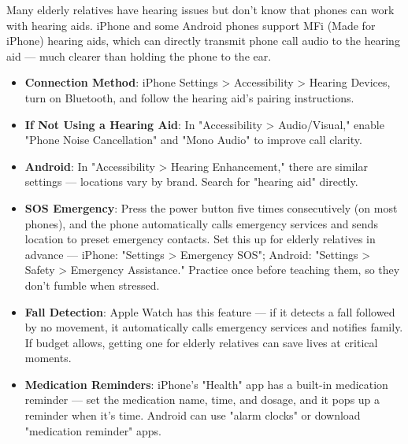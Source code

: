 
Many elderly relatives have hearing issues but don't know that phones can work with hearing aids. iPhone and some Android phones support MFi (Made for iPhone) hearing aids, which can directly transmit phone call audio to the hearing aid — much clearer than holding the phone to the ear.

\begin{itemize}
  \item \textbf{Connection Method}: iPhone Settings > Accessibility > Hearing Devices, turn on Bluetooth, and follow the hearing aid's pairing instructions.
  \item \textbf{If Not Using a Hearing Aid}: In "Accessibility > Audio/Visual," enable "Phone Noise Cancellation" and "Mono Audio" to improve call clarity.
  \item \textbf{Android}: In "Accessibility > Hearing Enhancement," there are similar settings — locations vary by brand. Search for "hearing aid" directly.
\end{itemize}


\begin{itemize}
  \item \textbf{SOS Emergency}: Press the power button five times consecutively (on most phones), and the phone automatically calls emergency services and sends location to preset emergency contacts. Set this up for elderly relatives in advance — iPhone: "Settings > Emergency SOS"; Android: "Settings > Safety > Emergency Assistance." Practice once before teaching them, so they don't fumble when stressed.
  \item \textbf{Fall Detection}: Apple Watch has this feature — if it detects a fall followed by no movement, it automatically calls emergency services and notifies family. If budget allows, getting one for elderly relatives can save lives at critical moments.
  \item \textbf{Medication Reminders}: iPhone's "Health" app has a built-in medication reminder — set the medication name, time, and dosage, and it pops up a reminder when it's time. Android can use "alarm clocks" or download "medication reminder" apps.
\end{itemize}

